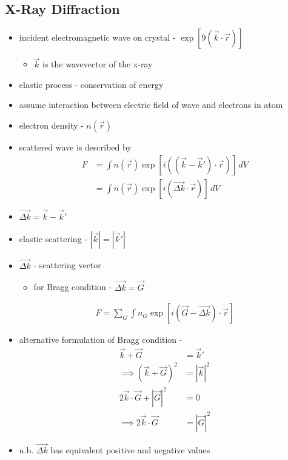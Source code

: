 \documentclass[a4paper,11pt,normalem]{article}
\begin{document}
\section{}
\subsection{X-Ray Diffraction}

\begin{itemize}
    \item incident electromagnetic wave on crystal - \(\exp[9(\vec{k}\cdot \vec{r})]\)
        \begin{itemize}
            \item \(\vec{k}\) is the wavevector of the x-ray
        \end{itemize}
    \item elastic process - conservation of energy
    \item assume interaction between electric field of wave and electrons in atom
    \item electron density - \(n(\vec{r})\)
    \item scattered wave is described by
        \begin{align*}
            F &= \int n(\vec{r})\exp\left[i((\vec{k}-\vec{k}')\cdot\vec{r})\right]\,dV \\
              &= \int n(\vec{r})\exp\left[i(\vec{\Delta k}\cdot \vec{r})\right]\,dV
        \end{align*}
    \item \(\vec{\Delta k} = \vec{k} - \vec{k}'\)
    \item elastic scattering - \(|\vec{k}| = |\vec{k}'|\)
    \item \(\vec{\Delta k}\) - scattering vector
        \begin{itemize}
            \item for Bragg condition - \(\vec{\Delta k} = \vec{G}\)
        \end{itemize}
        \begin{align*}
            F = \sum_G \int n_G \exp\left[i(\vec{G} - \vec{\Delta k})\cdot\vec{r}\right]
        \end{align*}
    \item alternative formulation of Bragg condition -
        \begin{align*}
            \vec{k} + \vec{G} &= \vec{k}' \\
            \implies (\vec{k} + \vec{G})^2 &= |\vec{k}|^2 \\
            2\vec{k}\cdot\vec{G} + |\vec{G}|^2 &= 0 \\
            \implies 2\vec{k}\cdot\vec{G} &= |\vec{G}|^2
        \end{align*}
    \item n.b. \(\vec{\Delta k}\) has equivalent positive and negative values
\end{itemize}
\end{document}
